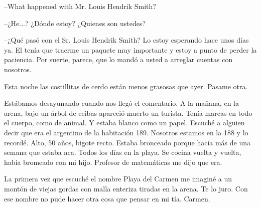 \documentclass[11pt,twoside,openright,a6paper]{book}
\begin{document}
\vspace{0.5cm}
\hrulefill\hspace{0.2cm} \decofourleft\decofourright \hspace{0.2cm} \hrulefill
\vspace{0.5cm}

\---What happened with Mr. Louis Hendrik Smith?

\---¿He...? ¿Dónde estoy? ¿Quienes son ustedes?

\---¿Qué pasó con el Sr. Louis Hendrik Smith? Lo estoy esperando hace
unos días ya. El tenía que traerme un paquete muy importante y estoy a
punto de perder la paciencia. Por suerte, parece, que lo mandó a usted a arreglar
cuentas con nosotros.


\vspace{0.5cm}
\hrulefill\hspace{0.2cm} \decofourleft\decofourright \hspace{0.2cm} \hrulefill
\vspace{0.5cm}

Esta noche las costillitas de cerdo están menos grasosas que ayer. Pasame
otra.


\vspace{0.5cm}
\hrulefill\hspace{0.2cm} \decofourleft\decofourright \hspace{0.2cm} \hrulefill
\vspace{0.5cm}

Estábamos desayunando cuando nos llegó el comentario. A la mañana, en la
arena, bajo un árbol de ceibas apareció muerto un turista. Tenía marcas
en todo el cuerpo, como de animal. Y estaba blanco como un papel. Escuché
a alguien decir que era el argentino de la habitación 189. Nosotros estamos
en la 188 y lo recordé. Alto, 50 años, bigote recto. Estaba bronceado
porque hacía más de una semana que estaba aca. Todos los días en la
playa. Se cocina vuelta y vuelta, había bromeado con mi hijo. Profesor de
matemáticas me dijo que era.


\vspace{0.5cm}
\hrulefill\hspace{0.2cm} \decofourleft\decofourright \hspace{0.2cm} \hrulefill
\vspace{0.5cm}

La primera vez que escuché el nombre Playa del Carmen me imaginé a un
montón de viejas gordas con malla enteriza tiradas en la arena. Te lo
juro. Con ese nombre no pude hacer otra cosa que pensar en mi tía. Carmen.
\end{document}
